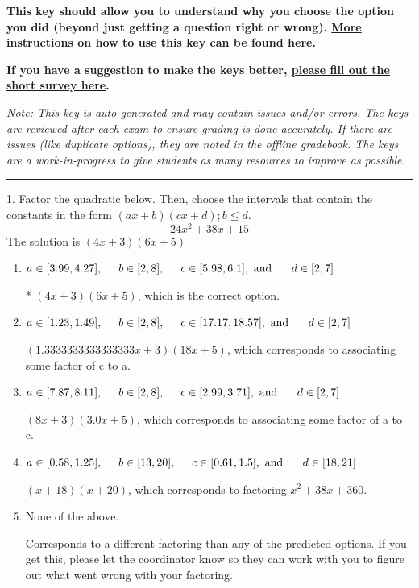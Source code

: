 \documentclass{extbook}[14pt]
\begin{document}
\textbf{This key should allow you to understand why you choose the option you did (beyond just getting a question right or wrong). \href{https://xronos.clas.ufl.edu/mac1105spring2020/courseDescriptionAndMisc/Exams/LearningFromResults}{More instructions on how to use this key can be found here}.}

\textbf{If you have a suggestion to make the keys better, \href{https://forms.gle/CZkbZmPbC9XALEE88}{please fill out the short survey here}.}

\textit{Note: This key is auto-generated and may contain issues and/or errors. The keys are reviewed after each exam to ensure grading is done accurately. If there are issues (like duplicate options), they are noted in the offline gradebook. The keys are a work-in-progress to give students as many resources to improve as possible.}

\rule{\textwidth}{0.4pt}

1. Factor the quadratic below. Then, choose the intervals that contain the constants in the form $(ax+b)(cx+d); b \leq d.$
\[ 24x^{2} +38 x + 15 \] 
The solution is $ (4x + 3)(6x + 5) $ 

\begin{enumerate}[label=\Alph*.] 
\item $ a \in [3.99, 4.27], \hspace*{5mm} b \in [2, 8], \hspace*{5mm} c \in [5.98, 6.1], \text{ and } \hspace*{5mm} d \in [2, 7] $ 

 * $(4x + 3)(6x + 5)$, which is the correct option. 
\item $ a \in [1.23, 1.49], \hspace*{5mm} b \in [2, 8], \hspace*{5mm} c \in [17.17, 18.57], \text{ and } \hspace*{5mm} d \in [2, 7] $ 

  $(1.3333333333333333x + 3)(18x + 5)$, which corresponds to associating some factor of c to a. 
\item $ a \in [7.87, 8.11], \hspace*{5mm} b \in [2, 8], \hspace*{5mm} c \in [2.99, 3.71], \text{ and } \hspace*{5mm} d \in [2, 7] $ 

  $(8x + 3)(3.0x + 5)$, which corresponds to associating some factor of a to c. 
\item $ a \in [0.58, 1.25], \hspace*{5mm} b \in [13, 20], \hspace*{5mm} c \in [0.61, 1.5], \text{ and } \hspace*{5mm} d \in [18, 21] $ 

  $(x + 18)(x + 20)$, which corresponds to factoring $x^{2} +38 x + 360$. 
\item $ \text{None of the above.} $ 

  Corresponds to a different factoring than any of the predicted options. If you get this, please let the coordinator know so they can work with you to figure out what went wrong with your factoring. 
\end{enumerate} 
 
\end{document}

